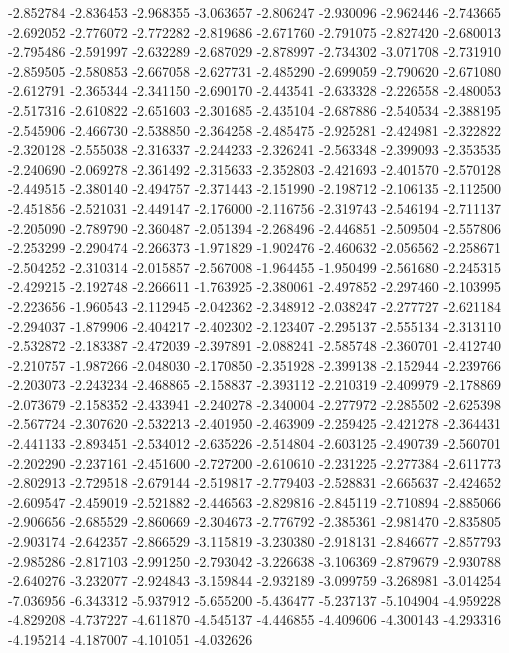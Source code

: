 -2.852784
-2.836453
-2.968355
-3.063657
-2.806247
-2.930096
-2.962446
-2.743665
-2.692052
-2.776072
-2.772282
-2.819686
-2.671760
-2.791075
-2.827420
-2.680013
-2.795486
-2.591997
-2.632289
-2.687029
-2.878997
-2.734302
-3.071708
-2.731910
-2.859505
-2.580853
-2.667058
-2.627731
-2.485290
-2.699059
-2.790620
-2.671080
-2.612791
-2.365344
-2.341150
-2.690170
-2.443541
-2.633328
-2.226558
-2.480053
-2.517316
-2.610822
-2.651603
-2.301685
-2.435104
-2.687886
-2.540534
-2.388195
-2.545906
-2.466730
-2.538850
-2.364258
-2.485475
-2.925281
-2.424981
-2.322822
-2.320128
-2.555038
-2.316337
-2.244233
-2.326241
-2.563348
-2.399093
-2.353535
-2.240690
-2.069278
-2.361492
-2.315633
-2.352803
-2.421693
-2.401570
-2.570128
-2.449515
-2.380140
-2.494757
-2.371443
-2.151990
-2.198712
-2.106135
-2.112500
-2.451856
-2.521031
-2.449147
-2.176000
-2.116756
-2.319743
-2.546194
-2.711137
-2.205090
-2.789790
-2.360487
-2.051394
-2.268496
-2.446851
-2.509504
-2.557806
-2.253299
-2.290474
-2.266373
-1.971829
-1.902476
-2.460632
-2.056562
-2.258671
-2.504252
-2.310314
-2.015857
-2.567008
-1.964455
-1.950499
-2.561680
-2.245315
-2.429215
-2.192748
-2.266611
-1.763925
-2.380061
-2.497852
-2.297460
-2.103995
-2.223656
-1.960543
-2.112945
-2.042362
-2.348912
-2.038247
-2.277727
-2.621184
-2.294037
-1.879906
-2.404217
-2.402302
-2.123407
-2.295137
-2.555134
-2.313110
-2.532872
-2.183387
-2.472039
-2.397891
-2.088241
-2.585748
-2.360701
-2.412740
-2.210757
-1.987266
-2.048030
-2.170850
-2.351928
-2.399138
-2.152944
-2.239766
-2.203073
-2.243234
-2.468865
-2.158837
-2.393112
-2.210319
-2.409979
-2.178869
-2.073679
-2.158352
-2.433941
-2.240278
-2.340004
-2.277972
-2.285502
-2.625398
-2.567724
-2.307620
-2.532213
-2.401950
-2.463909
-2.259425
-2.421278
-2.364431
-2.441133
-2.893451
-2.534012
-2.635226
-2.514804
-2.603125
-2.490739
-2.560701
-2.202290
-2.237161
-2.451600
-2.727200
-2.610610
-2.231225
-2.277384
-2.611773
-2.802913
-2.729518
-2.679144
-2.519817
-2.779403
-2.528831
-2.665637
-2.424652
-2.609547
-2.459019
-2.521882
-2.446563
-2.829816
-2.845119
-2.710894
-2.885066
-2.906656
-2.685529
-2.860669
-2.304673
-2.776792
-2.385361
-2.981470
-2.835805
-2.903174
-2.642357
-2.866529
-3.115819
-3.230380
-2.918131
-2.846677
-2.857793
-2.985286
-2.817103
-2.991250
-2.793042
-3.226638
-3.106369
-2.879679
-2.930788
-2.640276
-3.232077
-2.924843
-3.159844
-2.932189
-3.099759
-3.268981
-3.014254
-7.036956
-6.343312
-5.937912
-5.655200
-5.436477
-5.237137
-5.104904
-4.959228
-4.829208
-4.737227
-4.611870
-4.545137
-4.446855
-4.409606
-4.300143
-4.293316
-4.195214
-4.187007
-4.101051
-4.032626
